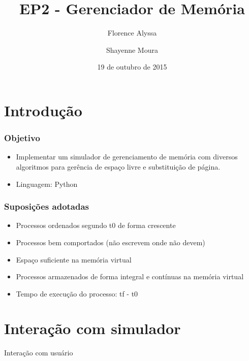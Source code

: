 \documentclass{beamer}
\title{EP2 - Gerenciador de Memória} %
\author{Florence Alyssa \and Shayenne Moura} %
\institute[USP] %
{
Sistemas Operacionais
 \\ Bacharelado em Ciência da Computação%
\medskip
\textit{} %
}
\date{19 de outubro de 2015} %
\begin{document}
\begin{frame}
\titlepage %
\end{frame}


\section{Introdução} 
\begin{frame}
\frametitle{Objetivo}
\begin{itemize}
\item Implementar um simulador de gerenciamento de memória com diversos algoritmos para gerência de espaço livre e substituição de página.
\newline

\item Linguagem: Python
\end{itemize}

\end{frame}

\begin{frame}
\frametitle{Suposições adotadas}
\begin{itemize}
\item Processos ordenados segundo t0 de forma crescente
\item Processos bem comportados (não escrevem onde não devem)
\item Espaço suficiente na memória virtual
\item Processos armazenados de forma integral e contínuas na memória virtual
\item Tempo de execução do processo: tf - t0
\end{itemize}
\end{frame}


\section{Interação com simulador}
\begin{frame}
\begin{LARGE}
\begin{center}
Interação com usuário
\end{center}
\end{LARGE}
\end{frame}
\end{document}
